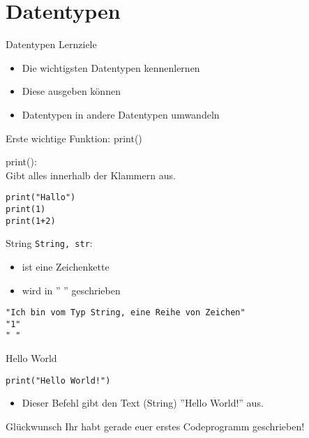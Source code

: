 \section{Datentypen}

\begin{frame}[fragile]{Datentypen}
Lernziele
\begin{itemize}
	\item Die wichtigsten Datentypen kennenlernen
	\item Diese ausgeben können
	\item Datentypen in andere Datentypen umwandeln
\end{itemize}
\end{frame}

\begin{frame}[fragile]{Erste wichtige Funktion: print()}

	print():\\
	Gibt alles innerhalb der Klammern aus.

\begin{lstlisting}
print("Hallo")
print(1)
print(1+2)
\end{lstlisting}
\end{frame}



\begin{frame}[fragile]{String}
\texttt{String, str}: 
     	\begin{itemize}
     		\item ist eine Zeichenkette
     		\item wird in '' '' geschrieben
     	\end{itemize}
       \begin{lstlisting}
"Ich bin vom Typ String, eine Reihe von Zeichen"
"1"
" "
    \end{lstlisting}
\end{frame}

\begin{frame}[fragile]{Hello World}
\begin{lstlisting}
print("Hello World!")
\end{lstlisting}
\begin{itemize}
	\item Dieser Befehl gibt den Text (String) ''Hello World!'' aus.
\end{itemize}
\begin{exampleblock}{Glückwunsch}
	Ihr habt gerade euer erstes Codeprogramm geschrieben!
\end{exampleblock}
\end{frame}


